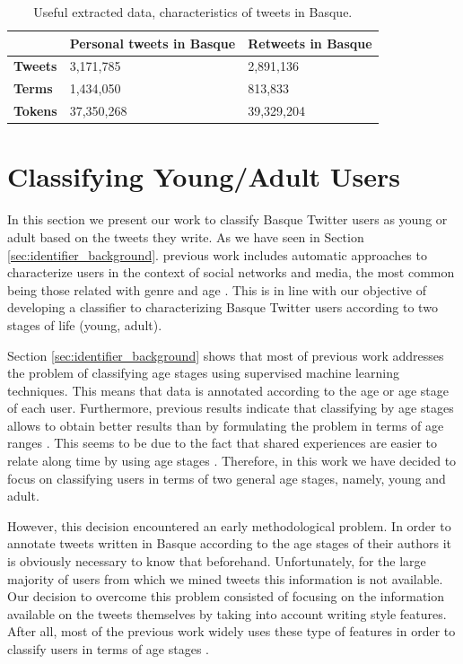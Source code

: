 \documentclass[information,article,submit,moreauthors,pdftex,10pt,a4paper]{Definitions/mdpi}
\begin{document}
\begin{table}[H]
  \centering
  \begin{tabular}{|l|l|l|}
    \hline
     & \textbf{Personal tweets in Basque} & \textbf{Retweets in Basque}\\ \hline
    \textbf{Tweets} & 3,171,785 & 2,891,136\\ \hline
    \textbf{Terms} & 1,434,050 & 813,833\\ \hline
    \textbf{Tokens}  & 37,350,268 & 39,329,204\\ \hline
  \end{tabular}
  \caption{Useful extracted data, characteristics of tweets in Basque.}
  \label{tab:useful-data}
\end{table}

\section{Classifying Young/Adult Users}\label{sec:class-young-users}

In this section we present our work to classify Basque Twitter users as young or adult based on the tweets they write. As we have seen in Section \ref{sec:identifier_background}. previous work includes automatic approaches to characterize users in the context of social networks and media, the most common being those related with genre and age \citep{cesare2017detection}. This is in line with our objective of developing a classifier to characterizing Basque Twitter users according to two stages of life (young, adult).

Section \ref{sec:identifier_background} shows that most of previous work addresses the problem of classifying age stages using supervised machine learning techniques. This means that data is annotated according to the age or age stage of each user. Furthermore, previous results indicate that classifying by age stages allows to obtain better results than by formulating the problem in terms of age ranges \citep{nguyen2013old}. This seems to be due to the fact that shared experiences are easier to relate along time by using age stages \citep{nguyen2016computational,eckert2017age}. Therefore, in this work we have decided to focus on classifying users in terms of two general age stages, namely, young and adult.

However, this decision encountered an early methodological problem. In order to annotate tweets written in Basque according to the age stages of their authors it is obviously necessary to know that beforehand. Unfortunately, for the large majority of users from which we mined tweets this information is not available. Our decision to overcome this problem consisted of focusing on the information available on the tweets themselves by taking into account writing style features. After all, most of the previous work widely uses these type of features in order to classify users in terms of age stages \citep{rao2010classifying,al2012homophily,nguyen2013old,morgan2017predicting}.
\end{document}
